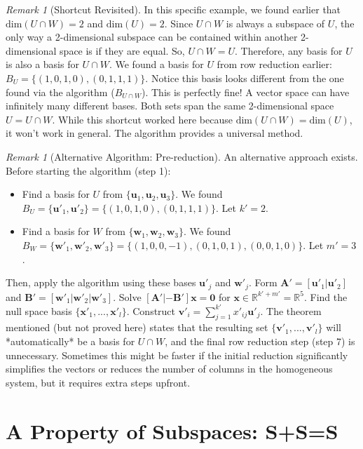 \documentclass[11pt]{article}
\theoremstyle{definition}
\theoremstyle{remark}
\newtheorem{remark}[theorem]{Remark}
\newcommand{\R}{\mathbb{R}}
\newcommand{\vsdim}{\text{dim}}
\newcommand{\vecu}{\mathbf{u}}
\newcommand{\vecv}{\mathbf{v}}
\newcommand{\vecw}{\mathbf{w}}
\newcommand{\vecx}{\mathbf{x}}
\newcommand{\veczero}{\mathbf{0}}
\newcommand{\matA}{\mathbf{A}}
\newcommand{\matB}{\mathbf{B}}
\begin{document}
\begin{remark}[Shortcut Revisited]
In this specific example, we found earlier that $\vsdim(U \cap W) = 2$ and $\vsdim(U) = 2$. Since $U \cap W$ is always a subspace of $U$, the only way a 2-dimensional subspace can be contained within another 2-dimensional space is if they are equal. So, $U \cap W = U$.
Therefore, any basis for $U$ is also a basis for $U \cap W$. We found a basis for $U$ from row reduction earlier: $B_U = \{(1, 0, 1, 0), (0, 1, 1, 1)\}$.
Notice this basis looks different from the one found via the algorithm ($B_{U \cap W}$). This is perfectly fine! A vector space can have infinitely many different bases. Both sets span the same 2-dimensional space $U = U \cap W$.
While this shortcut worked here because $\vsdim(U \cap W) = \vsdim(U)$, it won't work in general. The algorithm provides a universal method.
\end{remark}

\begin{remark}[Alternative Algorithm: Pre-reduction]
An alternative approach exists. Before starting the algorithm (step 1):
\begin{itemize}
    \item Find a basis for $U$ from $\{\vecu_1, \vecu_2, \vecu_3\}$. We found $B_U = \{\vecu'_1, \vecu'_2\} = \{(1, 0, 1, 0), (0, 1, 1, 1)\}$. Let $k'=2$.
    \item Find a basis for $W$ from $\{\vecw_1, \vecw_2, \vecw_3\}$. We found $B_W = \{\vecw'_1, \vecw'_2, \vecw'_3\} = \{(1, 0, 0, -1), (0, 1, 0, 1), (0, 0, 1, 0)\}$. Let $m'=3$.
\end{itemize}
Then, apply the algorithm using these bases $\vecu'_j$ and $\vecw'_j$. Form $\matA' = [\vecu'_1 | \vecu'_2]$ and $\matB' = [\vecw'_1 | \vecw'_2 | \vecw'_3]$. Solve $[\matA' | -\matB'] \vecx = \veczero$ for $\vecx \in \R^{k'+m'} = \R^5$. Find the null space basis $\{\vecx'_1, ..., \vecx'_l\}$. Construct $\vecv'_i = \sum_{j=1}^{k'} x'_{ij} \vecu'_j$. The theorem mentioned (but not proved here) states that the resulting set $\{\vecv'_1, ..., \vecv'_l\}$ will *automatically* be a basis for $U \cap W$, and the final row reduction step (step 7) is unnecessary.
Sometimes this might be faster if the initial reduction significantly simplifies the vectors or reduces the number of columns in the homogeneous system, but it requires extra steps upfront.
\end{remark}

\section{A Property of Subspaces: S+S=S}
\end{document}
